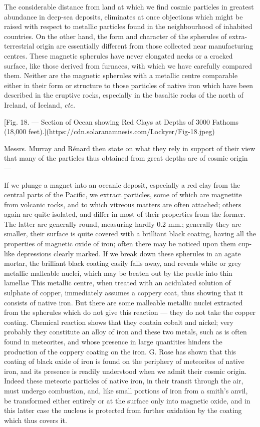 \documentclass[a4paper, 12pt, oneside, polutonikogreek, english]{article}
\begin{document}
The considerable distance from land at which we find cosmic particles in greatest abundance in deep-sea deposits, eliminates at once objections which might be raised with respect to metallic particles found in the neighbourhood of inhabited countries. On the other hand, the form and character of the spherules of extra-terrestrial origin are essentially different from those collected near manufacturing centres. These magnetic spherules have never elongated necks or a cracked surface, like those derived from furnaces, with which we have carefully compared them. Neither are the magnetic spherules with a metallic centre comparable either in their form or structure to those particles of native iron which have been described in the eruptive rocks, especially in the basaltic rocks of the north of Ireland, of Iceland, \emph{etc.}

[Fig. 18. --- Section of Ocean showing Red Clays at Depths of 3000 Fathoms (18,000 feet).](https://cdn.solaranamnesis.com/Lockyer/Fig-18.jpeg)

Messrs. Murray and Rénard then state on what they rely in support of their view that many of the particles thus obtained from great depths are of cosmic origin ---

If we plunge a magnet into an oceanic deposit, especially a red clay from the central parts of the Pacific, we extract particles, some of which are magnetite from volcanic rocks, and to which vitreous matters are often attached; others again are quite isolated, and differ in most of their properties from the former. The latter are generally round, measuring hardly 0.2 mm.; generally they are smaller, their surface is quite covered with a brilliant black coating, having all the properties of magnetic oxide of iron; often there may be noticed upon them cup-like depressions clearly marked. If we break down these spherules in an agate mortar, the brilliant black coating easily falls away, and reveals white or grey metallic malleable nuclei, which may be beaten out by the pestle into thin lamellae This metallic centre, when treated with an acidulated solution of sulphate of copper, immediately assumes a coppery coat, thus showing that it consists of native iron. But there are some malleable metallic nuclei extracted from the spherules which do not give this reaction --- they do not take the copper coating. Chemical reaction shows that they contain cobalt and nickel; very probably they constitute an alloy of iron and these two metals, such as is often found in meteorites, and whose presence in large quantities hinders the production of the coppery coating on the iron. G. Rose has shown that this coating of black oxide of iron is found on the periphery of meteorites of native iron, and its presence is readily understood when we admit their cosmic origin. Indeed these meteoric particles of native iron, in their transit through the air, must undergo combustion, and, like small portions of iron from a smith's anvil, be transformed either entirely or at the surface only into magnetic oxide, and in this latter case the nucleus is protected from further oxidation by the coating which thus covers it.
\end{document}
